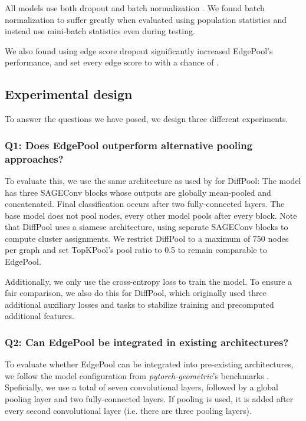 \documentclass{article}
\newcommand{\edgepool}{EdgePool}
\newcommand{\sageconv}{SAGEConv}
\begin{document}
All models use both dropout and batch normalization \citep{Ioffe2015}. We found batch normalization to suffer greatly when evaluated using population statistics and instead use mini-batch statistics even during testing.

We also found using edge score dropout significantly increased \edgepool{}'s performance, and set every edge score to  with a chance of .

\subsection{Experimental design}

To answer the questions we have posed, we design three different experiments.

\subsubsection{Q1: Does \edgepool{} outperform alternative pooling approaches?}
To evaluate this, we use the same architecture as used by \citet{yingHierarchicalGraphRepresentation2018} for DiffPool: The model has three \sageconv{} blocks \citep{hamiltonInductiveRepresentationLearning2017} whose outputs are globally mean-pooled and concatenated. Final classification occurs after two fully-connected layers. The base model does not pool nodes, every other model pools after every block. Note that DiffPool uses a siamese architecture, using separate \sageconv{} blocks to compute cluster assignments. We restrict DiffPool to a maximum of 750 nodes per graph and set TopKPool's pool ratio to 0.5 to remain comparable to EdgePool.

Additionally, we only use the cross-entropy loss to train the model. To ensure a fair comparison, we also do this for DiffPool, which originally used three additional auxiliary losses and tasks to stabilize training and precomputed additional features.


\subsubsection{Q2: Can \edgepool{} be integrated in existing architectures?}
To evaluate whether \edgepool{} can be integrated into pre-existing architectures, we follow the model configuration from \textit{pytorch-geometric}'s benchmarks \citep{feyFastGraphRepresentation2019}. Speficially, we use a total of seven convolutional layers, followed by a global pooling layer and two fully-connected layers. If pooling is used, it is added after every second convolutional layer (i.e. there are three pooling layers).
\end{document}
